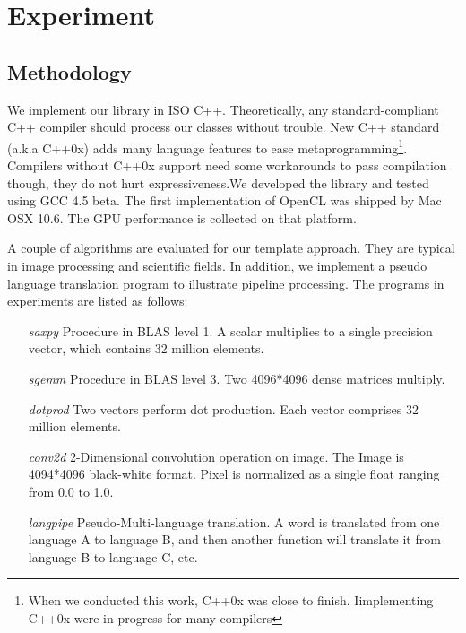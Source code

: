 \section{Experiment}\label{sec:eval}
\subsection{Methodology}\label{sectn:method}
We implement our library in ISO
C++. Theoretically, any standard-compliant C++ compiler
should process our classes without trouble. New C++ standard (a.k.a C++0x\cite{c++0x}) adds many language features to ease metaprogramming\footnote{When we
  conducted this work, C++0x was close to finish. Iimplementing C++0x
  were in progress for many compilers}. Compilers
without C++0x support need some workarounds to pass compilation
though, they do not hurt expressiveness.We developed the library and
tested using GCC 4.5 beta.  The
first implementation of OpenCL was shipped by Mac OSX 10.6. The GPU performance is collected on that platform.


A couple of algorithms are evaluated for our template approach.  They
are typical in image processing and scientific fields. In
addition, we implement a pseudo language translation program to
illustrate pipeline processing. The programs in experiments are listed
as follows:

\begin{itemize}
\item[\textit{saxpy}] Procedure in BLAS level 1. A scalar multiplies to a single precision vector, which contains 32 million elements.
\item[\textit{sgemm}] Procedure in BLAS level 3. Two 4096*4096 dense matrices multiply.
\item[\textit{dotprod}] Two vectors perform dot production. Each vector
  comprises 32 million elements.
\item[\textit{conv2d}] 2-Dimensional convolution operation on image.  The Image
  is 4094*4096 black-white format. Pixel is normalized as a single
  float ranging from 0.0 to 1.0.
\item[\textit{langpipe}] Pseudo-Multi-language translation. A word is translated from one language A to language B, and then another function will translate it from language B to language C, etc.
\end{itemize}

